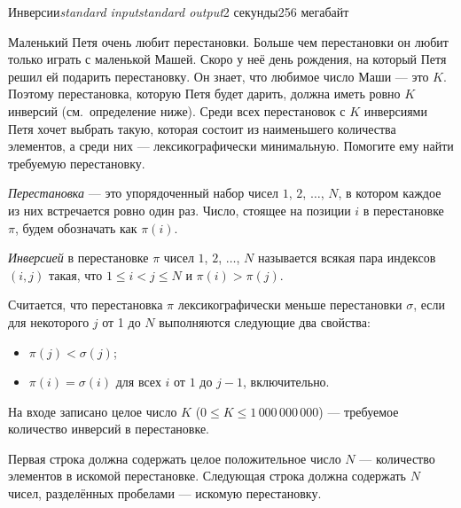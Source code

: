 \begin{problem}{Инверсии}{\textsl{standard input}}{\textsl{standard output}}{2 секунды}{256 мегабайт}

Маленький Петя очень любит перестановки. Больше чем перестановки он любит только играть с маленькой Машей. Скоро у неё день рождения, на который Петя решил ей подарить перестановку. Он знает, что любимое число Маши --- это $K$. Поэтому перестановка, которую Петя будет дарить, должна иметь ровно $K$ инверсий (см.~определение ниже). Среди всех перестановок с $K$ инверсиями Петя хочет выбрать такую, которая состоит из наименьшего количества элементов, а среди них --- лексикографически минимальную. Помогите ему найти требуемую перестановку.

\emph{Перестановка} --- это упорядоченный набор чисел $1$, $2$, $\dots$, $N$, в котором каждое из них встречается ровно один раз. Число, стоящее на позиции $i$ в перестановке $\pi$, будем обозначать как $\pi(i)$.

\emph{Инверсией} в перестановке $\pi$ чисел $1$, $2$, $\dots$, $N$ называется всякая пара индексов $(i, j)$ такая, что $1 \le i < j \le N$ и $\pi(i) > \pi(j)$.

Считается, что перестановка $\pi$ лексикографически меньше перестановки $\sigma$, если для некоторого $j$ от 1 до $N$ выполняются следующие два свойства:
\begin{itemize}
\item $\pi(j) < \sigma(j)$;
\item $\pi(i) = \sigma(i)$ для всех $i$ от $1$ до $j - 1$, включительно.
\end{itemize}

\InputFile
На входе записано целое число $K$ ($0 \le K \le 1\,000\,000\,000$) --- требуемое количество инверсий в перестановке.

\OutputFile
Первая строка должна содержать целое положительное число $N$ --- количество элементов в искомой перестановке. Следующая строка должна содержать $N$ чисел, разделённых пробелами --- искомую перестановку.

\Examples

\begin{example}
%
%
%
%
\end{example}

\end{problem}
